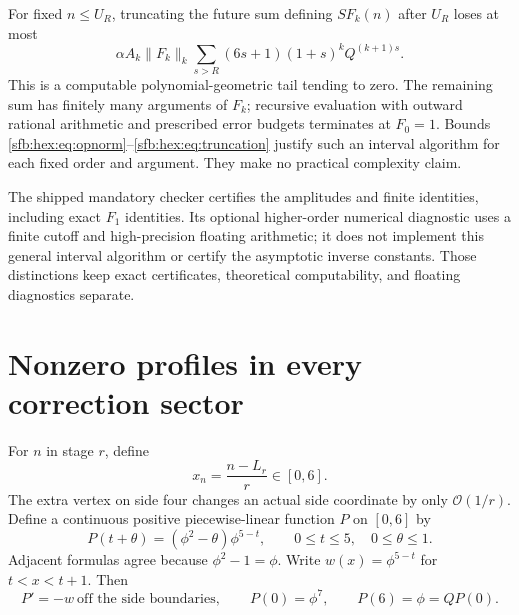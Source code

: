\documentclass[11pt]{article}
\theoremstyle{remark}\newtheorem{remark}[theorem]{Remark}
\newcommand{\OO}{\mathcal O}
\begin{document}
For fixed $n\le U_R$, truncating the future sum defining $SF_k(n)$ after $U_R$ loses at most
\begin{equation}\label{sfb:hex:eq:truncation}
 \alpha A_k\|F_k\|_k
 \sum_{s>R}(6s+1)(1+s)^kQ^{(k+1)s}.
\end{equation}
This is a computable polynomial-geometric tail tending to zero. The remaining sum has finitely many arguments of $F_k$; recursive evaluation with outward rational arithmetic and prescribed error budgets terminates at $F_0=1$. Bounds \eqref{sfb:hex:eq:opnorm}--\eqref{sfb:hex:eq:truncation} justify such an interval algorithm for each fixed order and argument. They make no practical complexity claim.

The shipped mandatory checker certifies the amplitudes and finite identities, including exact $F_1$ identities. Its optional higher-order numerical diagnostic uses a finite cutoff and high-precision floating arithmetic; it does not implement this general interval algorithm or certify the asymptotic inverse constants. Those distinctions keep exact certificates, theoretical computability, and floating diagnostics separate.

\section{Nonzero profiles in every correction sector}\label{sfb:hex:sec:profiles}
For $n$ in stage $r$, define
\begin{equation}\label{sfb:hex:eq:xphase}
 x_n=\frac{n-L_r}{r}\in[0,6].
\end{equation}
The extra vertex on side four changes an actual side coordinate by only $\OO(1/r)$. Define a continuous positive piecewise-linear function $P$ on $[0,6]$ by
\begin{equation}\label{sfb:hex:eq:Pprofile}
 P(t+\theta)=(\phi^2-\theta)\phi^{5-t},
 \qquad 0\le t\le5,\quad 0\le\theta\le1.
\end{equation}
Adjacent formulas agree because $\phi^2-1=\phi$. Write $w(x)=\phi^{5-t}$ for $t<x<t+1$. Then
\begin{equation}\label{sfb:hex:eq:Pidentities}
 P'=-w\ \text{off the side boundaries},\qquad
 P(0)=\phi^7,\qquad P(6)=\phi=QP(0).
\end{equation}
\end{document}
